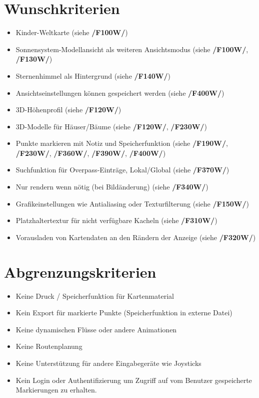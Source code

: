 \documentclass[10pt]{scrreprt}
\begin{document}
\section{Wunschkriterien}
\begin{itemize}
\item Kinder-Weltkarte (siehe \textbf{/F100W/})
\item Sonnensystem-Modellansicht als weiteren Ansichtsmodus (siehe \textbf{/F100W/}, \textbf{/F130W/})
\item Sternenhimmel als Hintergrund (siehe \textbf{/F140W/})
\item Ansichtseinstellungen können gespeichert werden (siehe \textbf{/F400W/})
\item 3D-Höhenprofil (siehe \textbf{/F120W/})
\item 3D-Modelle für Häuser/Bäume (siehe \textbf{/F120W/}, \textbf{/F230W/})
\item Punkte markieren mit Notiz und Speicherfunktion (siehe \textbf{/F190W/}, \textbf{/F230W/}, \textbf{/F360W/}, \textbf{/F390W/}, \textbf{/F400W/})
\item Suchfunktion für Overpass-Einträge, Lokal/Global (siehe \textbf{/F370W/})
\item Nur rendern wenn nötig (bei Bildänderung) (siehe \textbf{/F340W/})
\item Grafikeinstellungen wie Antialiasing oder Texturfilterung (siehe \textbf{/F150W/})
\item Platzhaltertextur für nicht verfügbare Kacheln (siehe \textbf{/F310W/})
\item Vorausladen von Kartendaten an den Rändern der Anzeige (siehe \textbf{/F320W/})
\end{itemize}

\section{Abgrenzungskriterien}
\begin{itemize}
\item Keine Druck / Speicherfunktion für Kartenmaterial
\item Kein Export für markierte Punkte (Speicherfunktion in externe Datei)
\item Keine dynamischen Flüsse oder andere Animationen
\item Keine Routenplanung
\item Keine Unterstützung für andere Eingabegeräte wie Joysticks
\item Kein Login oder Authentifizierung um Zugriff auf vom Benutzer gespeicherte Markierungen zu erhalten.
\end{itemize}
\end{document}
